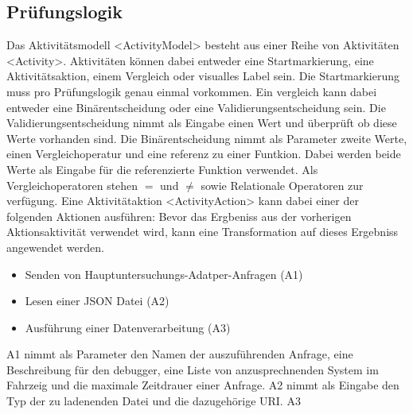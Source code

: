 \documentclass{article}
\begin{document}
    \subsection{Prüfungslogik}
    Das Aktivitätsmodell  <ActivityModel> besteht aus einer Reihe von Aktivitäten <Activity>.
    Aktivitäten können dabei entweder eine Startmarkierung, eine Aktivitätsaktion, einem Vergleich oder visualles Label sein.
    Die Startmarkierung muss pro Prüfungslogik genau einmal vorkommen.
    Ein vergleich kann dabei entweder eine Binärentscheidung oder eine Validierungsentscheidung sein.   
    Die Validierungsentscheidung nimmt als Eingabe einen Wert und überprüft ob diese Werte vorhanden sind.
    Die Binärentscheidung nimmt als Parameter zweite Werte, einen Vergleichoperatur und eine referenz zu einer Funtkion. Dabei werden beide Werte als Eingabe für die referenzierte Funktion verwendet.
    Als Vergleichoperatoren stehen $=$ und $\neq$ sowie Relationale Operatoren zur verfügung.
    Eine Aktivitätaktion <ActivityAction> kann dabei einer der folgenden Aktionen ausführen:
    Bevor das Ergbeniss aus der vorherigen Aktionsaktivität verwendet wird, kann eine Transformation auf dieses Ergebniss angewendet werden.
    \begin{itemize}
        \item Senden von Hauptuntersuchungs-Adatper-Anfragen (A1)
        \item Lesen einer JSON Datei (A2)
        \item Ausführung einer Datenverarbeitung (A3)
    \end{itemize}
    A1 nimmt als Parameter den Namen der auszuführenden Anfrage, eine Beschreibung für den debugger, eine Liste von anzusprechnenden System im Fahrzeig und die maximale Zeitdrauer einer Anfrage.
    A2 nimmt als Eingabe den Typ der zu ladenenden Datei und die dazugehörige URI.
    A3\\
\end{document}
